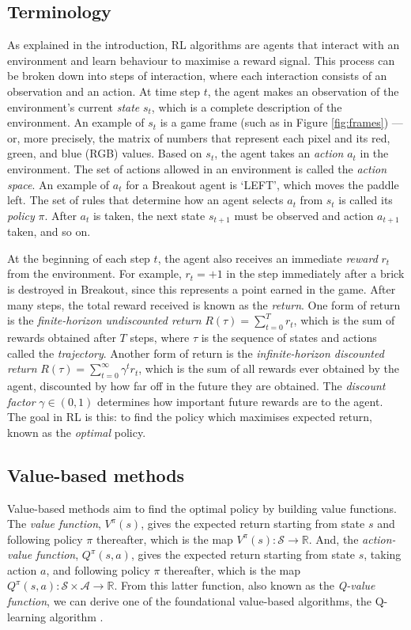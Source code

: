 \documentclass[12pt,a4paper]{article}
\begin{document}
\subsection{Terminology}
As explained in the introduction, RL algorithms are agents that interact with an environment and learn behaviour to maximise a reward signal. This process can be broken down into steps of interaction, where each interaction consists of an observation and an action. At time step $t$, the agent makes an observation of the environment's current \emph{state} $s_t$, which is a complete description of the environment. An example of $s_t$ is a game frame (such as in Figure \ref{fig:frames}) --- or, more precisely, the matrix of numbers that represent each pixel and its red, green, and blue (RGB) values. Based on $s_t$, the agent takes an \emph{action} $a_t$ in the environment. The set of actions allowed in an environment is called the \emph{action space}. An example of $a_t$ for a Breakout agent is `LEFT', which moves the paddle left. The set of rules that determine how an agent selects $a_t$ from $s_t$ is called its \emph{policy} $\pi$. After $a_t$ is taken, the next state $s_{t+1}$ must be observed and action $a_{t+1}$ taken, and so on. 

At the beginning of each step $t$, the agent also receives an immediate \emph{reward} $r_t$ from the environment. For example, $r_t = +1$ in the step immediately after a brick is destroyed in Breakout, since this represents a point earned in the game. After many steps, the total reward received is known as the \emph{return}. One form of return is the \emph{finite-horizon undiscounted return} $R(\tau) = \sum_{t=0}^T r_t$, which is the sum of rewards obtained after $T$ steps, where $\tau$ is the sequence of states and actions called the \emph{trajectory}. Another form of return is the \emph{infinite-horizon discounted return} $R(\tau) = \sum_{t=0}^{\infty} \gamma^t r_t$, which is the sum of all rewards ever obtained by the agent, discounted by how far off in the future they are obtained. The \emph{discount factor} $\gamma \in (0,1)$ determines how important future rewards are to the agent. The goal in RL is this: to find the policy which maximises expected return, known as the \emph{optimal} policy.  

\subsection{Value-based methods}
Value-based methods aim to find the optimal policy by building value functions. The \emph{value function}, $V^{\pi}(s)$, gives the expected return starting from state $s$ and following policy $\pi$ thereafter, which is the map $V^{\pi}(s): \mathcal{S} \rightarrow \mathbb{R}$. And, the \emph{action-value function}, $Q^{\pi}(s,a)$, gives the expected return starting from state $s$, taking action $a$, and following policy $\pi$ thereafter, which is the map $Q^{\pi}(s,a): \mathcal{S} \times \mathcal{A} \rightarrow \mathbb{R}$. From this latter function, also known as the \emph{Q-value function}, we can derive one of the foundational value-based algorithms, the Q-learning algorithm \cite{Watkins1992}.
\end{document}

